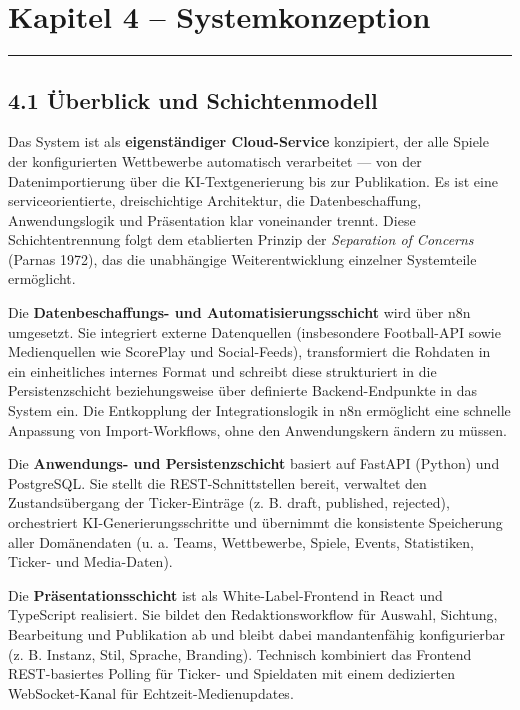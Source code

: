 \section{Kapitel 4 --
Systemkonzeption}\label{kapitel-4-systemkonzeption}

\begin{center}\rule{0.5\linewidth}{0.5pt}\end{center}

\subsection{4.1 Überblick und
Schichtenmodell}\label{uxfcberblick-und-schichtenmodell}

Das System ist als \textbf{eigenständiger Cloud-Service} konzipiert, der
alle Spiele der konfigurierten Wettbewerbe automatisch verarbeitet ---
von der Datenimportierung über die KI-Textgenerierung bis zur
Publikation. Es ist eine serviceorientierte, dreischichtige Architektur,
die Datenbeschaffung, Anwendungslogik und Präsentation klar voneinander
trennt. Diese Schichtentrennung folgt dem etablierten Prinzip der
\emph{Separation of Concerns} (Parnas 1972), das die unabhängige
Weiterentwicklung einzelner Systemteile ermöglicht.

Die \textbf{Datenbeschaffungs- und Automatisierungsschicht} wird über
n8n umgesetzt. Sie integriert externe Datenquellen (insbesondere
Football-API sowie Medienquellen wie ScorePlay und Social-Feeds),
transformiert die Rohdaten in ein einheitliches internes Format und
schreibt diese strukturiert in die Persistenzschicht beziehungsweise
über definierte Backend-Endpunkte in das System ein. Die Entkopplung der
Integrationslogik in n8n ermöglicht eine schnelle Anpassung von
Import-Workflows, ohne den Anwendungskern ändern zu müssen.

Die \textbf{Anwendungs- und Persistenzschicht} basiert auf FastAPI
(Python) und PostgreSQL. Sie stellt die REST-Schnittstellen bereit,
verwaltet den Zustandsübergang der Ticker-Einträge (z. B. draft,
published, rejected), orchestriert KI-Generierungsschritte und übernimmt
die konsistente Speicherung aller Domänendaten (u. a. Teams,
Wettbewerbe, Spiele, Events, Statistiken, Ticker- und Media-Daten).

Die \textbf{Präsentationsschicht} ist als White-Label-Frontend in React
und TypeScript realisiert. Sie bildet den Redaktionsworkflow für
Auswahl, Sichtung, Bearbeitung und Publikation ab und bleibt dabei
mandantenfähig konfigurierbar (z. B. Instanz, Stil, Sprache, Branding).
Technisch kombiniert das Frontend REST-basiertes Polling für Ticker- und
Spieldaten mit einem dedizierten WebSocket-Kanal für
Echtzeit-Medienupdates.

